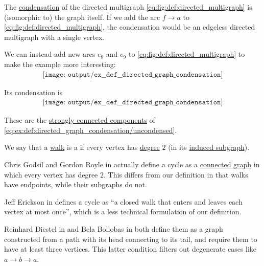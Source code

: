 \begin{example}\label{ex:def:directed_graph_condensation}
  The \hyperref[def:directed_graph_condensation]{condensation} of the directed multigraph \eqref{eq:fig:def:directed_multigraph} is (isomorphic to) the graph itself. If we add the arc \( f \to a \) to \eqref{eq:fig:def:directed_multigraph}, the condensation would be an edgeless directed multigraph with a single vertex.

  We can instead add new arcs \( e_8 \) and \( e_9 \) to \eqref{eq:fig:def:directed_multigraph} to make the example more interesting:
  \begin{equation}\label{eq:ex:def:directed_graph_condensation/uncondensed}
    \begin{aligned}
      \texttt{[image: output/ex\_\_def\_\_directed\_graph\_condensation]}
    \end{aligned}
  \end{equation}

  Its condensation is
  \begin{equation}\label{eq:ex:def:directed_graph_condensation/condensed}
    \begin{aligned}
      \texttt{[image: output/ex\_\_def\_\_directed\_graph\_condensation]}
    \end{aligned}
  \end{equation}

  These are the \hyperref[def:graph_connectedness/strong]{strongly connected components} of \eqref{eq:ex:def:directed_graph_condensation/uncondensed}.
\end{example}

\begin{definition}\label{def:graph_cycle}
  We say that a \hyperref[def:graph_walk]{walk} is a  if every vertex has \hyperref[def:graph_cardinality/directed_degree]{degree} \( 2 \) (in its \hyperref[def:graph_walk/subgraph]{induced subgraph}).
\end{definition}
\begin{comments}
  \item Chris Godsil and Gordon Royle in \cite[4]{GodsilRoyle2001} actually define a cycle as a \hyperref[def:graph_connectedness]{connected graph} in which every vertex has degree \( 2 \). This differs from our definition in that walks have endpoints, while their subgraphs do not.

  Jeff Erickson in \cite[191]{Erickson2019} defines a cycle as \enquote{a closed walk that enters and leaves each vertex at most once}, which is a less technical formulation of our definition.

  Reinhard Diestel in \cite[7]{Diestel2005} and Bela Bollobas in \cite[5]{Bollobas1998} both define them as a graph constructed from a path with its head connecting to its tail, and require them to have at least three vertices. This latter condition filters out degenerate cases like \( a \to b \to a \).
\end{comments}

